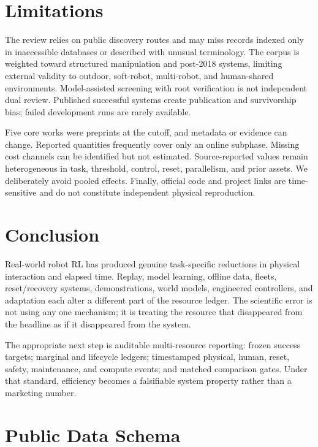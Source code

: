 \documentclass[11pt]{article}
\begin{document}
\section{Limitations}

The review relies on public discovery routes and may miss records indexed only in inaccessible databases or described with unusual terminology. The corpus is weighted toward structured manipulation and post-2018 systems, limiting external validity to outdoor, soft-robot, multi-robot, and human-shared environments. Model-assisted screening with root verification is not independent dual review. Published successful systems create publication and survivorship bias; failed development runs are rarely available.

Five core works were preprints at the cutoff, and metadata or evidence can change. Reported quantities frequently cover only an online subphase. Missing cost channels can be identified but not estimated. Source-reported values remain heterogeneous in task, threshold, control, reset, parallelism, and prior assets. We deliberately avoid pooled effects. Finally, official code and project links are time-sensitive and do not constitute independent physical reproduction.

\section{Conclusion}

Real-world robot RL has produced genuine task-specific reductions in physical interaction and elapsed time. Replay, model learning, offline data, fleets, reset/recovery systems, demonstrations, world models, engineered controllers, and adaptation each alter a different part of the resource ledger. The scientific error is not using any one mechanism; it is treating the resource that disappeared from the headline as if it disappeared from the system.

The appropriate next step is auditable multi-resource reporting: frozen success targets; marginal and lifecycle ledgers; timestamped physical, human, reset, safety, maintenance, and compute events; and matched comparison gates. Under that standard, efficiency becomes a falsifiable system property rather than a marketing number.

\appendix

\section{Public Data Schema}
\end{document}
